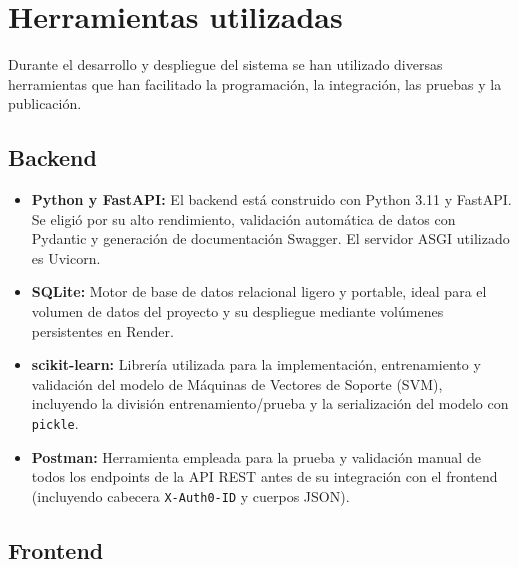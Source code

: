 \section{Herramientas utilizadas}

Durante el desarrollo y despliegue del sistema se han utilizado diversas herramientas que han facilitado la programación, la integración, las pruebas y la publicación.

\subsection{Backend}

\begin{itemize}
    \item \textbf{Python y FastAPI:} El backend está construido con Python 3.11 y FastAPI. Se eligió por su alto rendimiento, validación automática de datos con Pydantic y generación de documentación Swagger. El servidor ASGI utilizado es Uvicorn.
    \item \textbf{SQLite:} Motor de base de datos relacional ligero y portable, ideal para el volumen de datos del proyecto y su despliegue mediante volúmenes persistentes en Render.
    \item \textbf{scikit-learn:} Librería utilizada para la implementación, entrenamiento y validación del modelo de Máquinas de Vectores de Soporte (SVM), incluyendo la división entrenamiento/prueba y la serialización del modelo con \texttt{pickle}.
    \item \textbf{Postman:} Herramienta empleada para la prueba y validación manual de todos los endpoints de la API REST antes de su integración con el frontend (incluyendo cabecera \texttt{X-Auth0-ID} y cuerpos JSON).
\end{itemize}

\subsection{Frontend}

